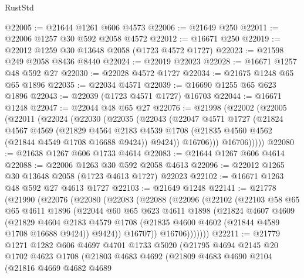 \begin{lexlean}{RustStd}
\begin{coremodule}
@22005 := @21644 @1261 @606 @4573
@22006 := @21649 @250
@22011 := @22006 @1257 @30 @592 @2058 @4572
@22012 := @16671 @250
@22019 := @22012 @1259 @30 @13648 @2058 (@1723 @4572 @1727)
@22023 := @21598 @249 @2058 @8436 @8440
@22024 := @22019 @22023
@22028 := @16671 @1257 @48 @592 @27
@22030 := @22028 @4572 @1727
@22034 := @21675 @1248 @65 @65 @1896
@22035 := @22034 @4571
@22039 := @16690 @1255 @65 @623 @1896
@22043 := @22039 (@1723 @4571 @1727) @16703
@22044 := @16671 @1248
@22047 := @22044 @48 @65 @27
@22076 := @21998
    (@22002
      (@22005
        (@22011
          (@22024
            (@22030
              (@22035
                (@22043
                  (@22047
                    @4571
                    @1727
                    (@21824
                      @4567
                      @4569
                      (@21829
                        @4564
                        @2183
                        @4539
                        @1708
                        (@21835 @4560 @4562 (@21844 @4549 @1708 @16688 @9424))
                        @9424))
                    @16706)))
              @16706)))))
@22080 := @21638 @1267 @606 @1733 @4614
@22083 := @21644 @1267 @606 @4614
@22088 := @22006 @1263 @30 @592 @2058 @4613
@22096 := @22012 @1265 @30 @13648 @2058 (@1723 @4613 @1727) @22023
@22102 := @16671 @1263 @48 @592 @27 @4613 @1727
@22103 := @21649 @1248
@22141 := @21778
    (@21990
      (@22076
        (@22080
          (@22083
            (@22088
              (@22096
                (@22102
                  (@22103
                    @58
                    @65
                    @65
                    @4611
                    @1896
                    (@22044
                      @60
                      @65
                      @623
                      @4611
                      @1898
                      (@21824
                        @4607
                        @4609
                        (@21829
                          @4604
                          @2183
                          @4579
                          @1708
                          (@21835 @4600 @4602 (@21844 @4589 @1708 @16688 @9424))
                          @9424))
                      @16707))
                  @16706)))))))
@22211 := @21779
    @1271
    @1282
    @606
    @4697
    @4701
    @1733
    @5020
    (@21795
      @4694
      @2145
      @20
      @1702
      @4623
      @1708
      (@21803
        @4683
        @4692
        (@21809
          @4683
          @4690
          @2104
          (@21816
            @4669
            @4682
            @4689

\end{coremodule}
\end{lexlean}
